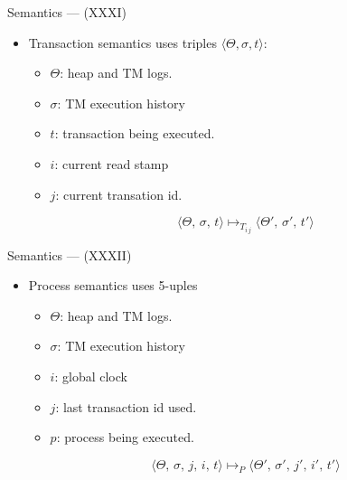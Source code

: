 \documentclass[14pt]{beamer}
\begin{document}
     \begin{frame}{Semantics --- (XXXI)}
        \begin{itemize}
          \item Transaction semantics uses triples $\langle \Theta, \sigma, t \rangle$:
          \begin{itemize}
             \item $\Theta$: heap and TM logs.
             \item $\sigma$: TM execution history
             \item $t$: transaction being executed.
             \item $i$: current read stamp
             \item $j$: current transation id.
          \end{itemize}
          \[\langle \Theta,\,\sigma,\,t \rangle \mapsto_{T_{i\,j}}
          \langle \Theta',\,\sigma',\, t'\rangle\]
        \end{itemize}
     \end{frame}
     \begin{frame}{Semantics --- (XXXII)}
        \begin{itemize}
           \item Process semantics uses 5-uples
           \begin{itemize}
             \item $\Theta$: heap and TM logs.
             \item $\sigma$: TM execution history
             \item $i$: global clock
             \item $j$: last transaction id used.
             \item $p$: process being executed.
           \end{itemize}
          \[\langle \Theta,\,\sigma,\,j,\,i,\,t \rangle \mapsto_{P}
          \langle \Theta',\,\sigma',\,j',\,i',\, t'\rangle\]
        \end{itemize}
     \end{frame}
\end{document}

